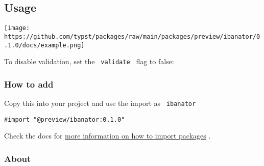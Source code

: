 \subsection{Usage}\label{usage}

\begin{Shaded}
\begin{Highlighting}[]

\end{Highlighting}
\end{Shaded}

\texttt{[image: https://github.com/typst/packages/raw/main/packages/preview/ibanator/0.1.0/docs/example.png]}

To disable validation, set the \texttt{\ validate\ } flag to false:

\begin{Shaded}
\begin{Highlighting}[]
\end{Highlighting}
\end{Shaded}

\subsubsection{How to add}\label{how-to-add}

Copy this into your project and use the import as \texttt{\ ibanator\ }

\begin{verbatim}
#import "@preview/ibanator:0.1.0"
\end{verbatim}



Check the docs for
\href{https://typst.app/docs/reference/scripting/\#packages}{more
information on how to import packages} .

\subsubsection{About}\label{about}

